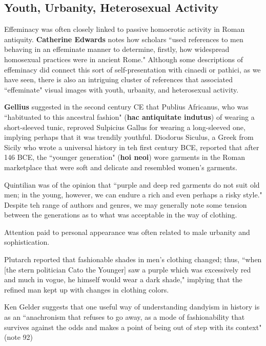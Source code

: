 \subsection{Youth, Urbanity, Heterosexual Activity}

Effeminacy was often closely linked to passive homoerotic activity in Roman antiquity. \textbf{Catherine Edwards} notes how scholars ``used references to men behaving in an effeminate manner to determine, firstly, how widespread homosexual practices were in ancient Rome." Although some descriptions of effeminacy did connect this sort of self-presentation with cinaedi or pathici, as we have seen, there is also an intriguing cluster of references that associated ``effeminate" visual images with youth, urbanity, and heterosexual activity.

\textbf{Gellius} suggested in the second century CE that Publius Africanus, who was ``habituated to this ancestral fashion" (\textbf{hac antiquitate indutus}) of wearing a short-sleeved tunic, reproved Sulpicius Gallus for wearing a long-sleeved one, implying perhaps that it was trendily youthful. Diodorus Siculus, a Greek from Sicily who wrote a universal history in teh first century BCE, reported that after 146 BCE, the ``younger generation" (\textbf{hoi neoi}) wore garments in the Roman marketplace that were soft and delicate and resembled women's garments.

Quintilian was of the opinion that ``purple and deep red garments do not suit old men; in the young, however, we can endure a rich and even perhaps a risky style."  Despite teh range of authors and genres, we may generally note some tension between the generations as to what was acceptable in the way of clothing.


\begin{rmk}
    Attention paid to personal appearance was often related to male urbanity and sophistication.
\end{rmk}

Plutarch reported that fashionable shades in men's clothing changed; thus, ``when [the stern politician Cato the Younger] saw a purple which was excessively red and much in vogue, he himself would wear a dark shade," implying that the refined man kept up with changes in clothing colors.

\begin{rmk}
    Ken Gelder suggests that one useful way of understanding dandyism in history is as an ``anachronism that refuses to go away, as a mode of fashionability that survives against the odds and makes a point of being out of step with its context" (note 92)
\end{rmk}

